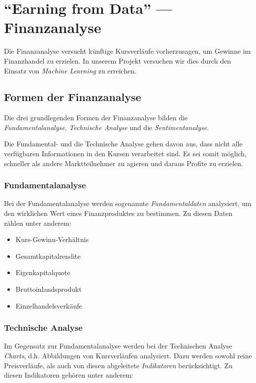 \section{\enquote{Earning from Data} --- Finanzanalyse}
\author{Dennis Kempf, Moritz Hollenberg, Patrice Becker}

Die Finanzanalyse versucht künftige Kursverläufe vorherzusagen, um Gewinne im Finanzhandel zu erzielen. In unserem Projekt versuchen wir dies durch den Einsatz von \emph{Machine Learning} zu erreichen.

\subsection{Formen der Finanzanalyse}
\author{Dennis Kempf}

Die drei grundlegenden Formen der Finanzanalyse bilden die \emph{Fundamentalanalyse}, \emph{Technische Analyse} und die \emph{Sentimentanalyse}. 

Die Fundamental- und die Technische Analyse gehen davon aus, dass nicht alle verfügbaren Informationen in den Kursen verarbeitet sind. Es sei somit möglich, schneller als andere Marktteilnehmer zu agieren und daraus Profite zu erzielen.

\subsubsection{Fundamentalanalyse}
\author{Dennis Kempf}

Bei der Fundamentalanalyse werden sogenannte \emph{Fundamentaldaten} analysiert, um den wirklichen Wert eines Finanzproduktes zu bestimmen. Zu diesen Daten zählen unter anderem:\\ 

\begin{itemize}
	\item Kurs-Gewinn-Verhältnis
	\item Gesamtkapitalrendite
	\item Eigenkapitalquote
	\item Bruttoinlandsprodukt
	\item Einzelhandelsverkäufe
\end{itemize}

\subsubsection{Technische Analyse}
\author{Dennis Kempf}
\label{sssec:TechnischeAnalyse}

Im Gegensatz zur Fundamentalanalyse werden bei der Technischen Analyse \emph{Charts}, d.h. Abbildungen von Kursverläufen analysiert. Dazu werden sowohl reine Preisverläufe, als auch von diesen abgeleitete \emph{Indikatoren} berücksichtigt. Zu diesen Indikatoren gehören unter anderem:\\

